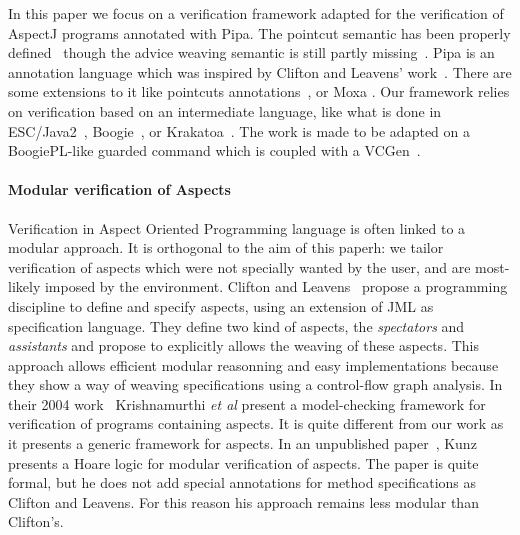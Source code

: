 In this paper we focus on a verification framework adapted for the
verification of AspectJ programs annotated with Pipa.  The pointcut
semantic has been properly
defined~\cite{DBLP:conf/popl/AvgustinovHOMSTV07} though the advice
weaving semantic is still partly missing~\cite{weaving06}.  Pipa is an
annotation language which was inspired by Clifton and Leavens'
work~\cite{clifton02observers}. There are some extensions to it like
pointcuts annotations~\cite{pointcuts07}, or Moxa \cite{moxa05}.
Our framework  relies on verification based
on an intermediate language, 
like what is done in ESC/Java2~\cite{FlanaganLLNSS02},
 Boogie~\cite{BarnettCDJL05}, or Krakatoa~\cite{MarcheP-MU04}. The work
is made to be adapted on a BoogiePL-like guarded command which
is coupled with a VCGen~\cite{BarnettL05,FlanaganS01}.

\paragraph{Modular verification of Aspects}
Verification in Aspect Oriented Programming language is often linked
to a modular approach.  It is orthogonal to the aim of this paperh: we
tailor verification of aspects which were not specially wanted by the
user, and are most-likely imposed by the environment.  Clifton and
Leavens~\cite{clifton02observers,clifton02spectators,cliftonPhd}
propose a programming discipline to define and specify aspects, using
an extension of JML as specification language.  They define two kind
of aspects, the \emph{spectators} and \emph{assistants} and propose to
explicitly allows the weaving of these aspects. This approach allows
efficient modular reasonning and easy implementations because they
show a way of weaving specifications using a control-flow graph
analysis. In their 2004 work~\cite{shriram04} Krishnamurthi {\it et
al} present a model-checking framework for verification of programs
containing aspects. It is quite different from our work as it presents
a generic framework for aspects. In an unpublished paper~\cite{cesar},
Kunz presents a Hoare logic for modular verification of aspects. The
paper is quite formal, but he does not add special annotations for method
specifications as Clifton and Leavens. For this reason his approach remains 
less modular than Clifton's.











